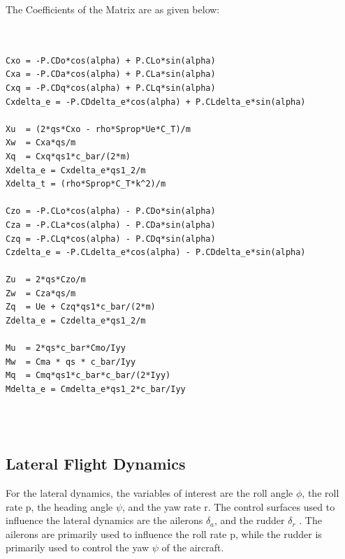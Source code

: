 The Coefficients of the Matrix are as given below: \\\
\begin{lstlisting}
	
Cxo = -P.CDo*cos(alpha) + P.CLo*sin(alpha)
Cxa = -P.CDa*cos(alpha) + P.CLa*sin(alpha)
Cxq = -P.CDq*cos(alpha) + P.CLq*sin(alpha)
Cxdelta_e = -P.CDdelta_e*cos(alpha) + P.CLdelta_e*sin(alpha)

Xu  = (2*qs*Cxo - rho*Sprop*Ue*C_T)/m
Xw  = Cxa*qs/m
Xq  = Cxq*qs1*c_bar/(2*m)
Xdelta_e = Cxdelta_e*qs1_2/m
Xdelta_t = (rho*Sprop*C_T*k^2)/m

Czo = -P.CLo*cos(alpha) - P.CDo*sin(alpha)
Cza = -P.CLa*cos(alpha) - P.CDa*sin(alpha)
Czq = -P.CLq*cos(alpha) - P.CDq*sin(alpha)
Czdelta_e = -P.CLdelta_e*cos(alpha) - P.CDdelta_e*sin(alpha)

Zu  = 2*qs*Czo/m
Zw  = Cza*qs/m
Zq  = Ue + Czq*qs1*c_bar/(2*m)
Zdelta_e = Czdelta_e*qs1_2/m

Mu  = 2*qs*c_bar*Cmo/Iyy
Mw  = Cma * qs * c_bar/Iyy
Mq  = Cmq*qs1*c_bar*c_bar/(2*Iyy)
Mdelta_e = Cmdelta_e*qs1_2*c_bar/Iyy
\end{lstlisting}\\\

\subsection{Lateral Flight Dynamics}
For the lateral dynamics, the variables of interest are the roll angle $\phi$, the
roll rate p, the heading angle $\psi$, and the yaw rate r. The control surfaces
used to influence the lateral dynamics are the ailerons $\delta_{a}$, and the rudder
$\delta_{r}$ . The ailerons are primarily used to influence the roll rate p, while the
rudder is primarily used to control the yaw $\psi$ of the aircraft.\\\

